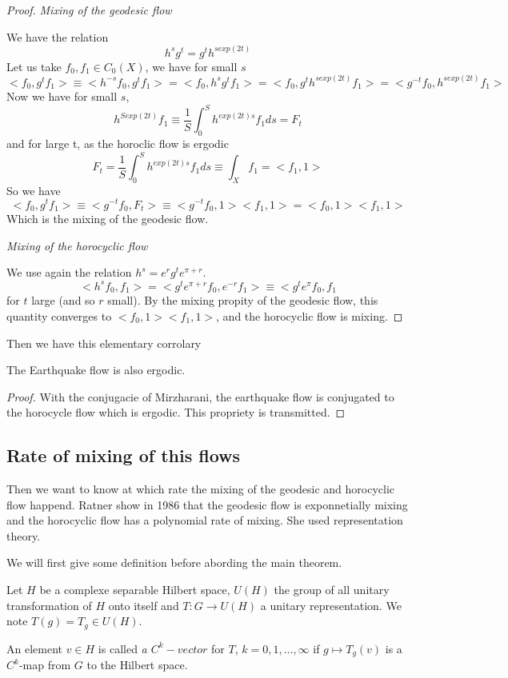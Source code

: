 \begin{proof}
\emph{Mixing of the geodesic flow}

We have the relation \[
h^s g^t =g^t h^{s exp(2t)}
\]
Let us take $f_0,f_1 \in C_0(X)$,
we have for small $s$ %
\[
<f_0,g^t f_1 > \equiv <h^{-s} f_0,g^t f_1 >=<f_0 , h^s g^t f_1 >
= <f_0 , g^t h^{s exp(2t)} f_1 > = <g^{-t} f_0 , h^{s exp(2t)}f_1>
\]
Now we have for small $s$, \[
h^{S exp(2t)}f_1 \equiv \frac{1}{S} \int_0^S h^{exp(2t)s} f_1 ds =F_t
\]
and for large t, as the horoclic flow is ergodic \[
F_t = \frac{1}{S} \int_0^S h^{exp(2t)s} f_1 ds \equiv \int_X f_1 = <f_1 , 1 >
\]
So we have \[
<f_0, g^t f_1 > \equiv <g^{-t} f_0, F_t > \equiv <g^{-t} f_0 ,1 ><f_1,1> = <f_0,1><f_1,1>
\]
Which is the mixing of the geodesic flow.

\emph{Mixing of the horocyclic flow}

We use again the relation $h^s = e^r g^t e^{\pi + r}$. \[
<h^s f_0 , f_1 > = < g^t  e^{\pi+r} f_0, e^{-r} f_1> \equiv <g^t e^{\pi} f_0, f_1
\]
for $t$ large (and so $r$ small). By the mixing propity of the geodesic flow, this quantity converges to $<f_0,1><f_1,1>$, and the horocyclic flow is mixing.

\end{proof}


Then we have this elementary corrolary

\begin{cor}
The Earthquake flow is also ergodic.
\end{cor}

\begin{proof}
With the conjugacie of Mirzharani, the earthquake flow is conjugated to the horocycle flow which is ergodic. This propriety is transmitted.
\end{proof}

\subsection{Rate of mixing of this flows}

Then we want to know at which rate the mixing of the geodesic and horocyclic flow happend. Ratner show in 1986 \cite{ratner_1987} that the geodesic flow is exponnetially mixing and the horocyclic flow has a polynomial rate of mixing. She used representation theory.

We will first give some definition before abording the main theorem.

\begin{dfnt}
Let $H$ be a  complexe separable Hilbert space, $U(H)$ the group of all unitary transformation of $H$ onto itself and $T: G \to U(H)$ a unitary representation. We note $T(g)=T_g \in U(H)$.

An element $v \in H$ is called \emph{a $C^k-vector$} for $T$, $k=0,1,...,\infty$ if $g \mapsto T_g(v)$ is a $C^k$-map from $G$ to the Hilbert space.
\end{dfnt}

